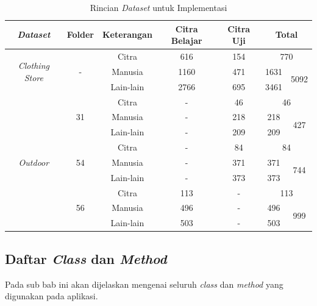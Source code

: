\begin{small}
\begin{longtable}{|c|c|c|c|c|c|c|}
\caption{Rincian \textit{Dataset} untuk Implementasi}
\label{tbl:rincianDataset}
\endhead
\hline
\textit{\textbf{Dataset}}			& \textbf{Folder}			& \textbf{Keterangan}	& \textbf{Citra Belajar}	& \textbf{Citra Uji}	& \multicolumn{2}{c|}{\textbf{Total}} \\ \hline
\multirow{3}{*}{\textit{Clothing Store}}	& \multirow{3}{*}{-}		& Citra				& 616					& 154				& \multicolumn{2}{c|}{770}            \\ \cline{3-7} 
								&						& Manusia			& 1160					& 471				& 1631     & \multirow{2}{*}{5092}    \\ \cline{3-6}
								&						& Lain-lain			& 2766					& 695				& 3461     &                          \\ \hline
\multirow{9}{*}{\textit{Outdoor}}		& \multirow{3}{*}{31}	& Citra				& - 						& 46				& \multicolumn{2}{c|}{46}             \\ \cline{3-7} 
								&						& Manusia			& - 						& 218				& 218      & \multirow{2}{*}{427}     \\ \cline{3-6}
								&						& Lain-lain			& - 						& 209				& 209      &                          \\ \cline{2-7} 
								& \multirow{3}{*}{54}	& Citra				& - 						& 84				& \multicolumn{2}{c|}{84}             \\ \cline{3-7} 
								&						& Manusia			& - 						& 371				& 371      & \multirow{2}{*}{744}     \\ \cline{3-6}
								&						& Lain-lain			& - 						& 373				& 373      &                          \\ \cline{2-7} 
								& \multirow{3}{*}{56}	& Citra				& 113					& - 					& \multicolumn{2}{c|}{113}            \\ \cline{3-7} 
								&						& Manusia			& 496					& - 					& 496      & \multirow{2}{*}{999}     \\ \cline{3-6}
								&						& Lain-lain			& 503					& - 					& 503      &                          \\ \hline
\end{longtable}
\end{small}
\endgroup

\subsection{Daftar \textit{Class} dan \textit{Method}}
\noindent Pada sub bab ini akan dijelaskan mengenai seluruh \textit{class} dan \textit{method} yang digunakan pada aplikasi.\\

